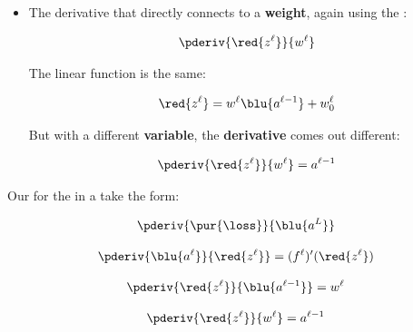         \begin{itemize}
                
            \item The derivative that directly connects to a \textbf{weight}, again using the :
            
                \begin{equation}
                    \pderiv {\red{z^\ell}}   {w^{\ell}}
                \end{equation}
                
                The linear function is the same:
            
                \begin{equation}
                    \red{z^\ell} = w^\ell \blu{ a^{\ell-1} } + w_0^\ell
                \end{equation}
                
                But with a different \textbf{variable}, the \textbf{derivative} comes out different:
                
                \begin{equation}
                    \pderiv {\red{z^\ell}}   {w^{\ell}}
                    =
                    a^{\ell-1} 
                \end{equation}
                
        \end{itemize}
        
    \begin{notation}
        Our  for the  in a  take the form:
        
        \begin{equation}
            \pderiv {\pur{\loss}} {\blu{a^L}}
        \end{equation}
        
        \begin{equation}
            \pderiv {\blu{a^\ell}}   {\red{z^\ell}} = (f^\ell)'(\red{z^\ell})
        \end{equation}
        
        \begin{equation}
            \pderiv {\red{z^\ell}}   {\blu{a^{\ell-1}}}
            =
            w^{\ell}
        \end{equation}
        
        \begin{equation}
            \pderiv {\red{z^\ell}}   {w^{\ell}}
            =
            a^{\ell-1} 
        \end{equation}
    \end{notation}

